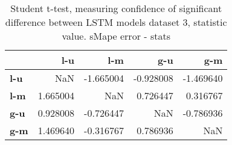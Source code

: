 \begin{table}[H]
\centering
\caption{Student t-test, measuring confidence of significant difference between LSTM models dataset 3, statistic value. sMape error - stats}
\label{table:ttest-stats-lstm-experiments-sMAPE-dataset-3}
\begin{tabular}{lrrrr}
\toprule
{} &       l-u &       l-m &       g-u &       g-m \\
\midrule
\textbf{l-u} &       NaN & -1.665004 & -0.928008 & -1.469640 \\
\textbf{l-m} &  1.665004 &       NaN &  0.726447 &  0.316767 \\
\textbf{g-u} &  0.928008 & -0.726447 &       NaN & -0.786936 \\
\textbf{g-m} &  1.469640 & -0.316767 &  0.786936 &       NaN \\
\bottomrule
\end{tabular}
\end{table}
